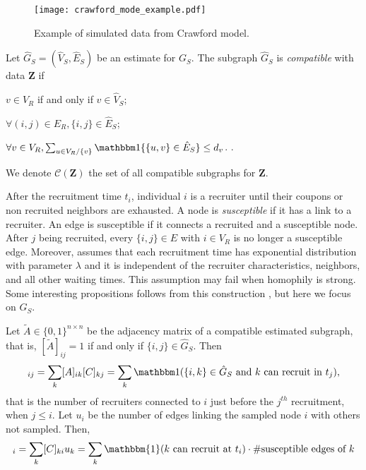 \begin{figure}
  \centering
  \caption{\label{fig:crawford_model_example}Example of simulated data from
  Crawford model.}
  \texttt{[image: crawford\_mode\_example.pdf]}
\end{figure}

\begin{definition}[Compatibility]
  Let $\hat{G}_S = (\hat{V}_S, \hat{E}_S)$ be an estimate for $G_S$. The 
  subgraph $\hat{G}_S$ is {\em compatible} with data $\boldsymbol{Z}$ if 
  \begin{alineas}
    \item $v \in V_R$ if and only if $v \in \hat{V}_S$;
    \item $\forall (i,j) \in E_R, \{i,j\} \in \hat{E}_S$;
    \item $\forall v \in V_R, \sum_{u \in V_R / \{v\}} \ind\{\{u,v\} \in
    \hat{E}_S\} \le d_v$. \cite[p. 197]{crawford2016}.
  \end{alineas}
  We denote $\mathcal{C}(\boldsymbol{Z})$ the set of all compatible subgraphs
  for $\boldsymbol{Z}$. 
\end{definition}

After the recruitment time $t_i$, individual $i$ is a recruiter until 
their coupons or non recruited neighbors are exhausted. 
A node is {\em susceptible} if it has a link to a recruiter. An edge is
susceptible if it connects a recruited and a susceptible node. After $j$ being
recruited, every $\{i,j\} \in E$ with $i \in V_R$ is no longer a susceptible
edge. Moreover, \textcite[p. 194]{crawford2016} assumes that each recruitment time
has exponential distribution with parameter $\lambda$ and it is independent of
the recruiter characteristics, neighbors, and all other waiting times. This assumption may
fail when homophily is strong. Some interesting propositions follows from this
construction \cite[p. 195]{crawford2016}, but here we focus on $G_S$. 

Let $\tilde{A} \in \{0,1\}^{n \times n}$ be the adjacency matrix of a  
compatible estimated subgraph, that is, $[\tilde{A}]_{ij} = 1$ if and only 
if $\{i,j\} \in \hat{G}_S$.
Then 
\begin{equation*}
  [AC]_{ij} = \sum_{k} [A]_{ik}[C]_{kj} = \sum_{k} \ind(\{i,k\} \in \hat{G}_S \text{ and } k \text{ can recruit in } t_j),  
\end{equation*}
that is the number of recruiters connected to $i$ just before the $j^{th}$
recruitment, when $j \le i$. Let $u_i$ be the number of edges linking the
sampled node $i$ with others not sampled. Then,
\begin{equation*}
  [C^T u]_{i} = \sum_{k} [C]_{ki} u_k  = \sum_k \mathbbm{1}(k \text{ can recruit at } t_i)\cdot \#\text{susceptible edges of }k 
\end{equation*}

